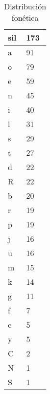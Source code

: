 \begin{table}[H]
\centering
\caption{Distribución fonética}
\label{tab:distribucion_fonetica}
\begin{tabular}{|l|l|}
sil & 173 \\ \hline
a   & 91  \\ \hline
o   & 79  \\ \hline
e   & 59  \\ \hline
n   & 45  \\ \hline
i   & 40  \\ \hline
l   & 31  \\ \hline
s   & 29  \\ \hline
t   & 27  \\ \hline
d   & 22  \\ \hline
R   & 22  \\ \hline
b   & 20  \\ \hline
r   & 19  \\ \hline
p   & 19  \\ \hline
j   & 16  \\ \hline
u   & 16  \\ \hline
m   & 15  \\ \hline
k   & 14  \\ \hline
g   & 11  \\ \hline
f   & 7   \\ \hline
c   & 5   \\ \hline
y   & 5   \\ \hline
C   & 2   \\ \hline
N   & 1   \\ \hline
S   & 1   \\ \hline
\end{tabular}
\end{table}